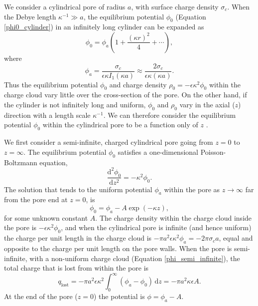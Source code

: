 We consider a cylindrical pore of radius $a$, with surface charge density
$\sigma_c$. When the Debye length $\kappa^{-1}\gg a$,  the
equilibrium potential $\phi_0$ (Equation \ref{phi0_cylinder}) in an infinitely long cylinder can be expanded as
\begin{equation}
\phi_0=\phi_a
\left(1+\frac{(\kappa   r)^2}{4}+\cdots\right),
\end{equation}
where
\begin{equation}
\phi_a=\frac{\sigma_c}{\epsilon\kappa I_1(\kappa a)}
\approx\frac{2\sigma_c}{\epsilon\kappa(\kappa a)}.
\label{phi1_defn}
\end{equation}
Thus the equilibrium potential $\phi_0$ and charge density
$\rho_0=-\epsilon\kappa^2\phi_0$
within the charge cloud vary little over the
cross-section of the pore. On the other hand, if the cylinder is not
infinitely long and uniform, $\phi_0$ and $\rho_0$ vary
in the axial ($z$) direction with a length scale $\kappa^{-1}$.
We can therefore consider the equilibrium potential $\phi_0$ 
within the cylindrical pore to be a function only of
$z$ \cite{singer2009}.



We first consider a semi-infinite, charged cylindrical pore going from $z=0$
to $z=\infty$. The equilibrium potential $\phi_0$
satisfies a one-dimensional Poisson-Boltzmann
equation,
\begin{equation}
\frac{\text{d}^2\phi_0}{\text{d}z^2}=-\kappa^2\phi_0.
\label{1D_PB_eqn}
\end{equation}
The solution that tends to the uniform potential $\phi_a$ within the
pore as $z\rightarrow\infty$ far from the pore end at $z=0$, is
\begin{equation}
\phi_0=\phi_a-A\exp(-\kappa z),
\label{phi_semi_infinite}
\end{equation}
for some unknown constant $A$. 
The charge density within the charge cloud
inside the pore is $-\epsilon\kappa^2\phi_0$, and when the cylindrical
pore is infinite (and hence uniform) the charge per unit length in the
charge cloud is $-\pi a^2\epsilon\kappa^2\phi_a=-2\pi\sigma_ca$, equal
and opposite to the charge per unit length on the pore walls. When the
pore is semi-infinite, with a non-uniform charge
cloud (Equation \ref{phi_semi_infinite}), the
total charge that is lost from within the pore is
\begin{equation}
q_\text{lost}=-\pi a^2\epsilon\kappa^2\int_0^\infty (\phi_a-\phi_0)\,\text{d}z
=-\pi a^2\kappa\epsilon A.
\label{q_lost_one_end}
\end{equation}
At the end of the pore ($z=0$) the potential
is $\phi=\phi_a-A$.  

